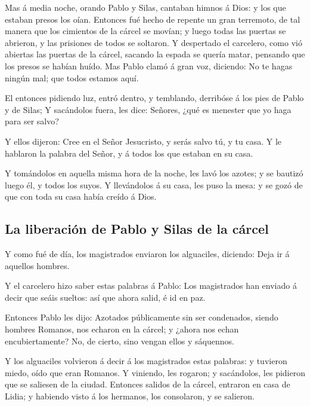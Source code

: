  Mas á media noche, orando Pablo y Silas, cantaban himnos á
Dios: y los que estaban presos los oían.  Entonces fué
hecho de repente un gran terremoto, de tal manera que los cimientos de
la cárcel se movían; y luego todas las puertas se abrieron, y las
prisiones de todos se soltaron.  Y despertado el carcelero,
como vió abiertas las puertas de la cárcel, sacando la espada se quería
matar, pensando que los presos se habían huído.  Mas Pablo
clamó á gran voz, diciendo: No te hagas ningún mal; que todos estamos
aquí.

 El entonces pidiendo luz, entró dentro, y temblando,
derribóse á los pies de Pablo y de Silas;  Y sacándolos
fuera, les dice: Señores, ¿qué es menester que yo haga para ser salvo?

 Y ellos dijeron: Cree en el Señor Jesucristo, y serás
salvo tú, y tu casa.  Y le hablaron la palabra del Señor, y
á todos los que estaban en su casa.

 Y tomándolos en aquella misma hora de la noche, les lavó
los azotes; y se bautizó luego él, y todos los suyos.  Y
llevándolos á su casa, les puso la mesa: y se gozó de que con toda su
casa había creído á Dios.

\hypertarget{la-liberaciuxf3n-de-pablo-y-silas-de-la-cuxe1rcel}{%
\subsection{La liberación de Pablo y Silas de la
cárcel}\label{la-liberaciuxf3n-de-pablo-y-silas-de-la-cuxe1rcel}}

 Y como fué de día, los magistrados enviaron los
alguaciles, diciendo: Deja ir á aquellos hombres.

 Y el carcelero hizo saber estas palabras á Pablo: Los
magistrados han enviado á decir que seáis sueltos: así que ahora salid,
é id en paz.

 Entonces Pablo les dijo: Azotados públicamente sin ser
condenados, siendo hombres Romanos, nos echaron en la cárcel; y ¿ahora
nos echan encubiertamente? No, de cierto, sino vengan ellos y sáquennos.

 Y los alguaciles volvieron á decir á los magistrados estas
palabras: y tuvieron miedo, oído que eran Romanos.  Y
viniendo, les rogaron; y sacándolos, les pidieron que se saliesen de la
ciudad.  Entonces salidos de la cárcel, entraron en casa de
Lidia; y habiendo visto á los hermanos, los consolaron, y se salieron.

